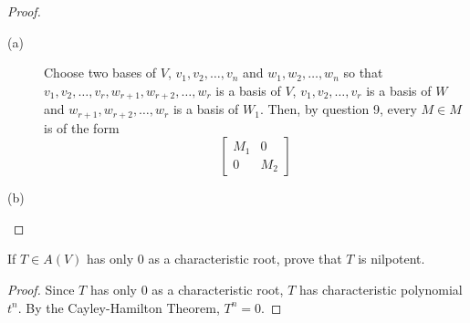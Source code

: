 \documentclass[12pt,leqno]{article}
\numberwithin{equation}{section}
\newcommand{\question}[2] {\vspace{.25in} \noindent\fbox{#1} #2 \vspace{.10in}}
\theoremstyle{definition}
\begin{document}
\begin{proof}
 \begin{description}
  \item [(a)] Choose two bases of $V$, $v_1,v_2,\hdots,v_n$ and $w_1,w_2,\hdots,w_n$ so that $v_1,v_2,\hdots,v_r,w_{r+1},w_{r+2},\hdots,w_r$ is a basis of $V$, $v_1,v_2,\hdots,v_r$ is a basis of $W$ and $w_{r+1},w_{r+2},\hdots,w_r$ is a basis of $W_1$. Then, by question 9, every $M\in M$ is of the form \[\left[\begin{array}{c|c}M_1&0\\\hline0&M_2\end{array}\right]\]
  \item [(b)] 
 \end{description}

\end{proof}


\question{19}{If $T\in A(V)$ has only 0 as a characteristic root, prove that $T$ is nilpotent.}

\begin{proof}
 Since $T$ has only 0 as a characteristic root, $T$ has characteristic polynomial $t^n$. By the Cayley-Hamilton Theorem, $T^n=0$. 
\end{proof}
\end{document}
